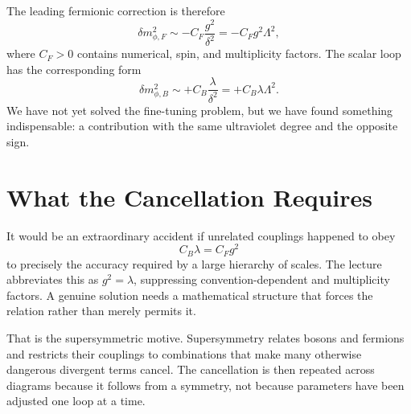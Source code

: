 \begin{classroomqa}
\end{classroomqa}

\begin{classroomqa}
\end{classroomqa}

The leading fermionic correction is therefore
\begin{equation}
\delta m_{\phi,F}^2
\sim -C_F\frac{g^2}{\delta^2}
=-C_Fg^2\Lambda^2,
\end{equation}
where \(C_F>0\) contains numerical, spin, and multiplicity factors. The scalar loop has the corresponding form
\begin{equation}
\delta m_{\phi,B}^2
\sim+C_B\frac{\lambda}{\delta^2}
=+C_B\lambda\Lambda^2.
\end{equation}
We have not yet solved the fine-tuning problem, but we have found something indispensable: a contribution with the same ultraviolet degree and the opposite sign.

\section{What the Cancellation Requires}

It would be an extraordinary accident if unrelated couplings happened to obey
\begin{equation}
C_B\lambda=C_Fg^2
\end{equation}
to precisely the accuracy required by a large hierarchy of scales. The lecture abbreviates this as \(g^2=\lambda\), suppressing convention-dependent and multiplicity factors. A genuine solution needs a mathematical structure that forces the relation rather than merely permits it.

That is the supersymmetric motive. Supersymmetry relates bosons and fermions and restricts their couplings to combinations that make many otherwise dangerous divergent terms cancel. The cancellation is then repeated across diagrams because it follows from a symmetry, not because parameters have been adjusted one loop at a time.


